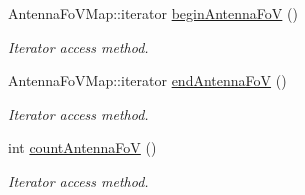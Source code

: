 \begin{DoxyCompactItemize}
\item 
Antenna\-Fo\-V\-Map\-::iterator \hyperlink{class_e_l_f_i_n_1_1_stub_antenna_a7e5d5ce80508d01937903ff96f3236cd}{begin\-Antenna\-Fo\-V} ()
\begin{DoxyCompactList}\small\item\em Iterator access method. \end{DoxyCompactList}\item 
Antenna\-Fo\-V\-Map\-::iterator \hyperlink{class_e_l_f_i_n_1_1_stub_antenna_a5c565d7f799950b727e529787f7b84d3}{end\-Antenna\-Fo\-V} ()
\begin{DoxyCompactList}\small\item\em Iterator access method. \end{DoxyCompactList}\item 
int \hyperlink{class_e_l_f_i_n_1_1_stub_antenna_a03a00f5852a4286914f06310b55dabfd}{count\-Antenna\-Fo\-V} ()
\begin{DoxyCompactList}\small\item\em Iterator access method. \end{DoxyCompactList}\end{DoxyCompactItemize}

